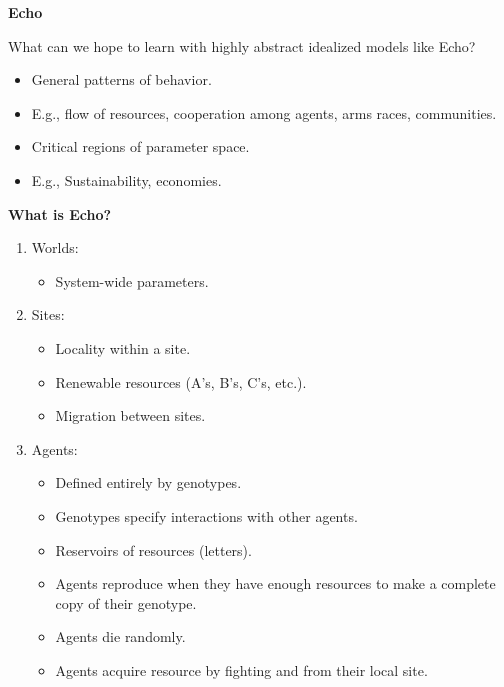 %
%
\begin{slide}{}
\centerline{\bf Echo}
What can we hope to learn with highly abstract idealized models
like Echo?
\begin{itemize}
\item General patterns of behavior.
\item E.g., flow of resources, cooperation among agents, arms races, 
communities.
\item Critical regions of parameter space.
\item E.g., Sustainability, economies.
\end{itemize}
\end{slide}

%
%
\begin{slide}{}
\centerline{\bf What is Echo?}
\begin{enumerate}
\vskip 15pt
\itemsep 0pt
\parsep  0pt
\parskip 0pt

\item Worlds:
\vskip 6pt
\begin{itemize}
\item System-wide parameters.
\end{itemize}
\item Sites:
\vskip 6pt
\begin{itemize}
\item Locality within a site.
\vskip 2pt
\item Renewable resources (A's, B's, C's, etc.).
\vskip 2pt
\item Migration between sites.
\vskip 4pt
\end{itemize}
\item Agents:
\vskip 6pt
\begin{itemize}
\item Defined entirely by genotypes.
\vskip 2pt
\item Genotypes specify interactions with other agents.
\vskip 2pt
\item Reservoirs of resources (letters).
\vskip 2pt
\item Agents reproduce when they have enough resources to make a complete
copy of their genotype.
\vskip 2pt
\item Agents die randomly.
\vskip 2pt
\item Agents acquire resource by fighting and from their local site.
\vskip 2pt
\end{itemize}
\end{enumerate}
\end{slide}

